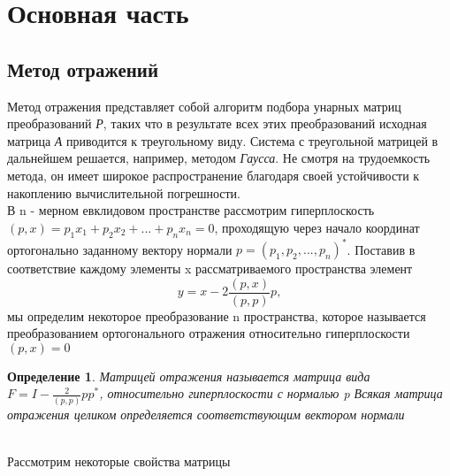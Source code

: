 \documentclass[14pt, titlepage, a4paper]{extarticle} %
\newtheorem{definition}{Определение}
\begin{document}
	
	\pagebreak
	
	
	\section*{Основная часть}
	
	\subsection*{Метод отражений}
	Метод отражения представляет собой алгоритм подбора унарных матриц преобразований \textit{Р}, таких что в результате всех этих преобразований исходная матрица \textit{А} приводится к треугольному виду. Система с треугольной матрицей в дальнейшем решается, например, методом \textit{Гаусса}. Не смотря на трудоемкость метода, он имеет широкое распространение благодаря своей устойчивости к накоплению вычислительной погрешности.\\

	В n - мерном евклидовом пространстве рассмотрим гиперплоскость $(p,x) = p_1 x_1 + p_2 x_2 + ... + p_n x_n = 0$, проходящую через начало координат ортогонально заданному вектору нормали $p = (p_1 ,p_2 ,...,p_n)^*$. Поставив в соответствие каждому элементы x рассматриваемого пространства элемент
	\begin{equation}\label{eq:1}
		y = x-2 \frac{(p,x)}{(p,p)}p,
	\end{equation}
	мы определим некоторое преобразование n пространства, которое называется преобразованием ортогонального отражения относительно гиперплоскости $(p,x)=0$
	\begin{definition}\label{def:1}
		Матрицей отражения называется матрица вида $F = I - \frac{2}{(p,p)}pp^*$, относительно гиперплоскости с нормалью p
		Всякая матрица отражения целиком определяется соответствующим вектором нормали
	\end{definition}
	~\\
	Рассмотрим некоторые свойства матрицы
	
\end{document}
